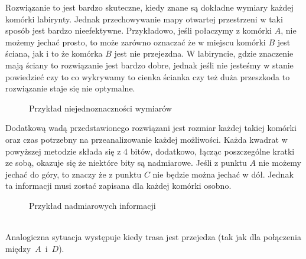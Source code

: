             Rozwiązanie to jest bardzo skuteczne, kiedy znane są dokładne wymiary każdej komórki labirynty.
            Jednak przechowywanie mapy otwartej przestrzeni w taki sposób jest bardzo nieefektywne.
            Przykładowo, jeśli połaczymy z komórki $A$, nie możemy jechać prosto, to może zarówno oznaczać że w miejscu komórki $B$ jest ściana, jak i to że komórka $B$ jest nie przejezdna.
            W labiryncie, gdzie znaczenie mają ściany to rozwiązanie jest bardzo dobre, jednak jeśli nie jesteśmy w stanie powiedzieć czy to co wykrywamy to cienka ścianka czy też duża przeszkoda to rozwiązanie staje się nie optymalne.

            \begin{figure}[!ht]
                \centering
                \caption{Przykład niejednoznaczności wymiarów}
            \end{figure}

            Dodatkową wadą przedstawionego rozwiązani jest rozmiar każdej takiej komórki oraz czas potrzebny na przeanalizowanie każdej możliwości.
            Każda kwadrat w powyższej metodzie składa się z 4 bitów, dodatkowo, łącząc poszczególne kratki ze sobą, okazuje się że niektóre bity są nadmiarowe.
            Jeśli z punktu $A$ nie możemy jechać do góry, to znaczy że z punktu $C$ nie będzie można jechać w dół.
            Jednak ta informacji musi zostać zapisana dla każdej komórki osobno.
            \begin{figure}[!ht]
                \centering
                \caption{Przykład nadmiarowych informacji}
            \end{figure}\\
            Analogiczna sytuacja występuje kiedy trasa jest przejedza (tak jak dla połączenia między~$A$~i~$D$).

